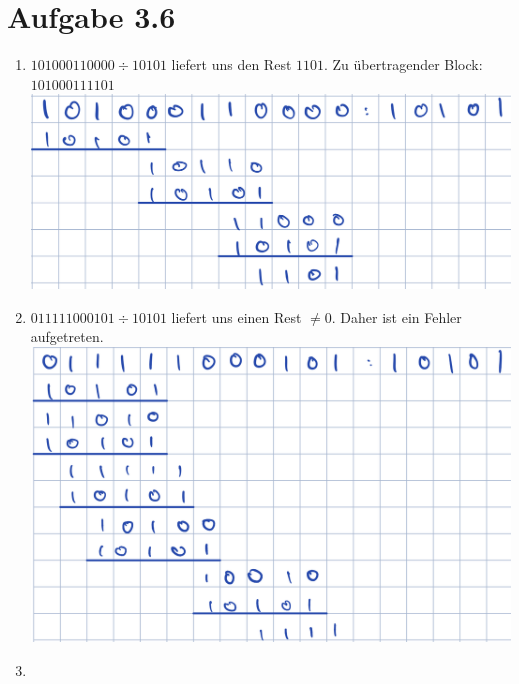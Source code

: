 \documentclass[12pt, a4paper]{article}
\begin{document}
\newpage

\section*{Aufgabe 3.6}
\begin{enumerate}[label=\alph*)]
	\item	$101000110000 \div 10101$ liefert uns den Rest $1101$. Zu übertragender Block: $101000111101$\\
			\includegraphics[scale=0.6]{3.6_a.png}
	
	\item	$011111000101 \div 10101$ liefert uns einen Rest $\neq 0$. Daher ist ein Fehler aufgetreten.\\
			\includegraphics[scale=0.6]{3.6_b.png}
	
	\item	
\end{enumerate}
\end{document}
